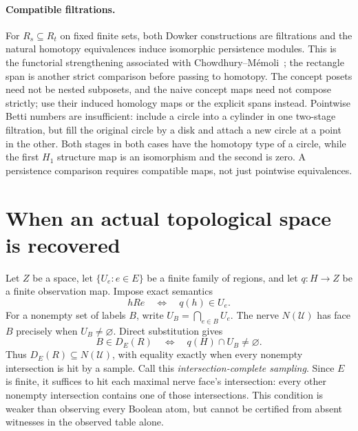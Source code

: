 \documentclass[11pt]{article}
\theoremstyle{remark}
\begin{document}
\paragraph{Compatible filtrations.}
For $R_s\subseteq R_t$ on fixed finite sets, both Dowker constructions
are filtrations and the natural homotopy equivalences induce isomorphic
persistence modules. This is the functorial strengthening associated with
Chowdhury--M\'emoli~\cite{cg:dowker-persistence}; the rectangle span is
another strict comparison before passing to homotopy. The concept posets
need not be nested subposets, and the naive concept maps need not compose
strictly; use their induced homology maps or the explicit spans instead.
Pointwise Betti numbers are insufficient: include a circle into a cylinder
in one two-stage filtration, but fill the original circle by a disk and
attach a new circle at a point in the other. Both stages in both cases have
the homotopy type of a circle, while the first $H_1$ structure map is an
isomorphism and the second is zero. A persistence comparison requires
compatible maps, not just pointwise equivalences.

\section{When an actual topological space is recovered}
\label{sec:reconstruction}
Let $Z$ be a space, let $\{U_e:e\in E\}$ be a finite family of regions,
and let $q:H\to Z$ be a finite observation map. Impose exact semantics
\[
 hRe\quad\Longleftrightarrow\quad q(h)\in U_e.
\]
For a nonempty set of labels $B$, write $U_B=\bigcap_{e\in B}U_e$.
The nerve $N(\mathcal U)$ has face $B$ precisely when $U_B\ne\varnothing$.
Direct substitution gives
\begin{equation}\label{cg:detected-intersections}
 B\in D_E(R)\quad\Longleftrightarrow\quad q(H)\cap U_B\ne\varnothing.
\end{equation}
Thus $D_E(R)\subseteq N(\mathcal U)$, with equality exactly when every
nonempty intersection is hit by a sample. Call this
\emph{intersection-complete sampling}. Since $E$ is finite, it suffices
to hit each maximal nerve face's intersection: every other nonempty
intersection contains one of those intersections. This condition is
weaker than observing every Boolean atom, but cannot be certified from
absent witnesses in the observed table alone.
\end{document}

